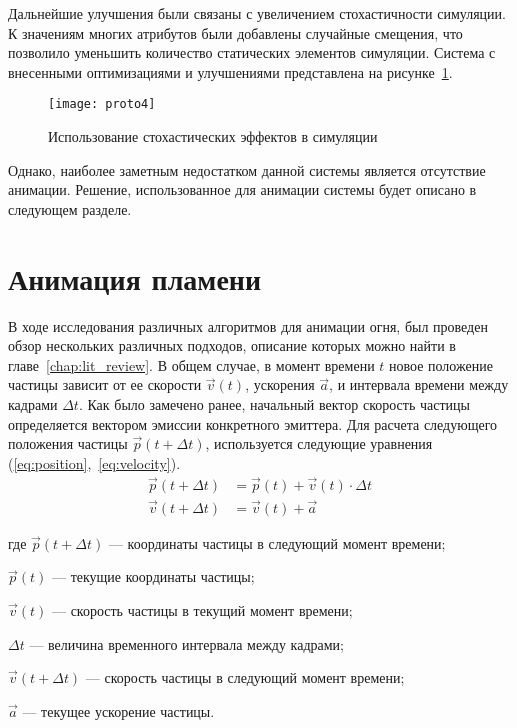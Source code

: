 Дальнейшие улучшения были связаны с увеличением стохастичности симуляции. К
значениям многих атрибутов были добавлены случайные смещения, что позволило
уменьшить количество статических элементов симуляции. Система с внесенными
оптимизациями и улучшениями представлена на рисунке~\ref{fig:proto4}.
\begin{figure}[htb]
	\centering
    \texttt{[image: proto4]}
    \caption{Использование стохастических эффектов в симуляции}%
    \label{fig:proto4}
\end{figure}
Однако, наиболее заметным недостатком данной системы является отсутствие
анимации. Решение, использованное для анимации системы будет описано в следующем
разделе.

\section{Анимация пламени}

В ходе исследования различных алгоритмов для анимации огня, был проведен обзор
нескольких различных подходов, описание которых можно найти в
главе~\ref{chap:lit_review}. В общем случае, в момент времени $t$ новое
положение частицы зависит от ее скорости $\vec{v}(t)$, ускорения $\vec{a}$, и интервала
времени между кадрами $\Delta t$. Как было замечено ранее, начальный вектор
скорость частицы определяется вектором эмиссии конкретного эмиттера. Для расчета
следующего положения частицы $\vec{p}(t + \Delta{t})$, используется следующие
уравнения (\ref{eq:position},~\ref{eq:velocity}).
\begin{align}
  \label{eq:position}
  \vec{p}(t + \Delta{t}) &= \vec{p}(t) + \vec{v}(t) \cdot \Delta{t} \\
  \label{eq:velocity}
  \vec{v}(t + \Delta{t}) &= \vec{v}(t) + \vec{a}
\end{align}
\begin{explanationx}
    \item [где] $\vec{p}(t + \Delta{t})$ --- координаты частицы в следующий
        момент времени;
    \item $\vec{p}(t)$ --- текущие координаты частицы;
    \item $\vec{v}(t)$ --- скорость частицы в текущий момент времени;
    \item $\Delta{t}$ --- величина временного интервала между кадрами;
    \item $\vec{v}(t + \Delta{t})$ --- скорость частицы в следующий момент времени;
    \item $\vec{a}$ --- текущее ускорение частицы.
\end{explanationx}

